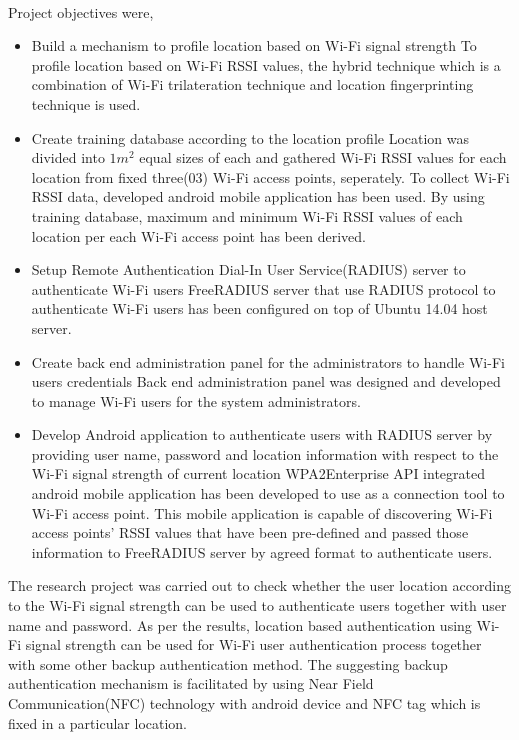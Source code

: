 \paragraph{}
Project objectives were,
\begin{itemize}
	\item Build a mechanism to profile location based on Wi-Fi signal strength
		\subitem To profile location based on Wi-Fi RSSI values, the hybrid technique which is a combination of Wi-Fi trilateration technique and location fingerprinting technique is used.
	
	\item Create training database according to the location profile
		\subitem Location was divided into $1m^2$ equal sizes of each and gathered Wi-Fi RSSI values for each location from fixed three(03) Wi-Fi access points, seperately. To collect Wi-Fi RSSI data, developed android mobile application has been used. By using training database, maximum and minimum Wi-Fi RSSI values of each location per each Wi-Fi access point has been derived.
	
	\item Setup Remote Authentication Dial-In User Service(RADIUS) server to authenticate Wi-Fi users
		\subitem FreeRADIUS server that use RADIUS protocol to authenticate Wi-Fi users has been configured on top of Ubuntu 14.04 host server.
	
	\item Create back end administration panel for the administrators to handle Wi-Fi users credentials 
		\subitem Back end administration panel was designed and developed to manage Wi-Fi users for the system administrators.
	
	\item Develop Android application to authenticate users with RADIUS server by providing user name, password and location information with respect to the Wi-Fi signal strength of current location
		\subitem WPA2Enterprise API integrated android mobile application has been developed to use as a connection tool to Wi-Fi access point. This mobile application is capable of discovering Wi-Fi access points' RSSI values that have been pre-defined and passed those information to FreeRADIUS server by agreed format to authenticate users.
\end{itemize}

The research project was carried out to check whether the user location according to the Wi-Fi signal strength can be used to authenticate users together with user name and password. As per the results, location based authentication using Wi-Fi signal strength can be used for Wi-Fi user authentication process together with some other backup authentication method. The suggesting backup authentication mechanism is facilitated by  using Near Field Communication(NFC) technology with android device and NFC tag which is fixed in a particular location.

